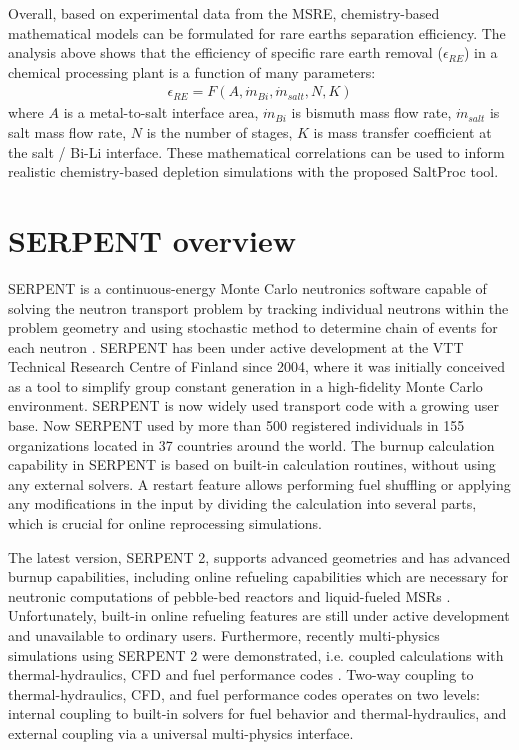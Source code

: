 Overall, based on experimental data from the \gls{MSRE}, chemistry-based mathematical 
models can be formulated for rare earths separation efficiency. The analysis above 
shows that the efficiency of specific rare earth removal ($\epsilon_{RE}$) in a chemical 
processing plant is a function of many parameters:
\begin{align}
\epsilon_{RE} = F (A, \dot{m}_{Bi}, \dot{m}_{salt}, N, K)
\end{align} 
where $A$ is a metal-to-salt interface area, $\dot{m}_{Bi}$ is bismuth mass 
flow rate, $\dot{m}_{salt}$ is salt mass flow rate, $N$ is the number of stages, 
$K$ is mass transfer coefficient at the salt / Bi-Li interface. 
These mathematical correlations can be used to inform realistic chemistry-based 
depletion simulations with the proposed SaltProc tool.

\section{SERPENT overview}
SERPENT is a continuous-energy Monte Carlo neutronics software capable of solving the neutron transport problem by tracking individual neutrons within the problem geometry and using stochastic method to determine chain of events for each neutron \cite{leppanen_serpent_2015}. SERPENT has been under active development at the VTT Technical Research Centre of Finland since 2004, where it was initially conceived as a tool to simplify group constant generation in a high-fidelity Monte Carlo environment. SERPENT is now widely used transport code  with a growing user base. Now SERPENT used by more than 500 registered individuals in 155 organizations located in 37 countries around the world. The burnup calculation capability in SERPENT is based on built-in calculation routines, without using any external solvers. A restart feature allows performing fuel shuffling or applying any modifications in the input by dividing the calculation into several parts, which is crucial for online reprocessing simulations.

The latest version, SERPENT 2, supports advanced geometries and has advanced burnup capabilities, including online refueling capabilities which are necessary for neutronic computations of pebble-bed reactors and liquid-fueled \glspl{MSR} \cite{aufiero_extended_2013}. Unfortunately, built-in online refueling features are still under active development and unavailable to ordinary users. Furthermore, recently multi-physics simulations using SERPENT 2 were demonstrated, i.e. coupled calculations with thermal-hydraulics, \gls{CFD} and fuel performance codes \cite{leppanen_numerical_2015}. Two-way coupling to thermal-hydraulics, \gls{CFD}, and fuel performance codes operates on two levels: internal coupling to built-in solvers for fuel behavior and thermal-hydraulics, and external coupling via a universal multi-physics interface. 

